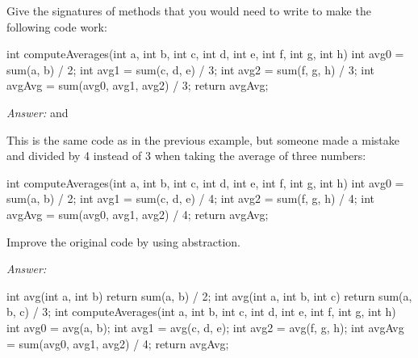 \begin{example}
Give the signatures of methods that you would need to write
to make the following code work:
\begin{code}
int computeAverages(int a, int b, int c, int d, int e, int f, int g, int h) {
  int avg0 = sum(a, b) / 2;
  int avg1 = sum(c, d, e) / 3;
  int avg2 = sum(f, g, h) / 3;
  int avgAvg = sum(avg0, avg1, avg2) / 3;
  return avgAvg;
}
\end{code}

\noindent \emph{Answer:}
 and 
\end{example}

\begin{example}
This is the same code as in the previous example, but
someone made a mistake and divided by 4 instead of 3
when taking the average of three numbers:
\begin{code}
int computeAverages(int a, int b, int c, int d, int e, int f, int g, int h) {
  int avg0 = sum(a, b) / 2;
  int avg1 = sum(c, d, e) / 4;
  int avg2 = sum(f, g, h) / 4;
  int avgAvg = sum(avg0, avg1, avg2) / 4;
  return avgAvg;
}
\end{code}
Improve the original code by using abstraction.

\noindent \emph{Answer:}
\begin{code}
int avg(int a, int b) {
  return sum(a, b) / 2;
}
int avg(int a, int b, int c) {
  return sum(a, b, c) / 3;
}
int computeAverages(int a, int b, int c, int d, int e, int f, int g, int h) {
  int avg0 = avg(a, b);
  int avg1 = avg(c, d, e);
  int avg2 = avg(f, g, h);
  int avgAvg = sum(avg0, avg1, avg2) / 4;
  return avgAvg;
}
\end{code}

\end{example}
